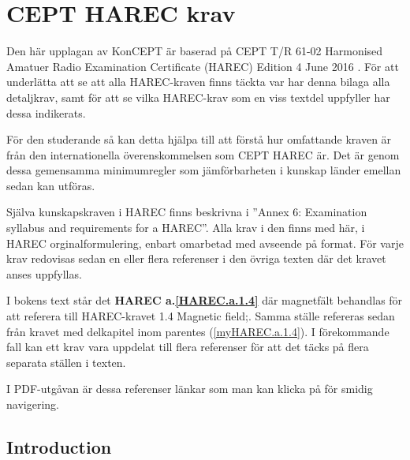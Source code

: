 
\chapter{CEPT HAREC krav}
\label{CEPT HAREC}

Den här upplagan av KonCEPT är baserad på CEPT T/R 61-02 Harmonised Amatuer
Radio Examination Certificate (HAREC) Edition 4 June 2016 \cite{TR6102}.
För att underlätta att se att alla HAREC-kraven finns täckta var har denna
bilaga alla detaljkrav, samt för att se vilka HAREC-krav som en viss textdel
uppfyller har dessa indikerats.

För den studerande så kan detta hjälpa till att förstå hur omfattande kraven är
från den internationella överenskommelsen som CEPT HAREC är.
Det är genom dessa gemensamma minimumregler som jämförbarheten i kunskap
länder emellan sedan kan utföras.

Själva kunskapskraven i HAREC finns beskrivna i
''Annex 6: Examination syllabus and requirements for a HAREC''.
Alla krav i den finns med här, i HAREC orginalformulering, enbart omarbetad
med avseende på format.
För varje krav redovisas sedan en eller flera referenser i den övriga texten
där det kravet anses uppfyllas.

I bokens text står det \textbf{HAREC a.\ref{HAREC.a.1.4}} där magnetfält
behandlas för att referera till HAREC-kravet 1.4 Magnetic field;.
Samma ställe refereras sedan från kravet med delkapitel inom parentes
(\ref{myHAREC.a.1.4}).
I förekommande fall kan ett krav vara uppdelat till flera referenser för att
det täcks på flera separata ställen i texten.

I PDF-utgåvan är dessa referenser länkar som man kan klicka på för smidig
navigering.

\section{Introduction}

\makeatletter
\renewcommand{\theenumii}{\arabic{enumii}}
\renewcommand{\labelenumii}{\theenumi.\theenumii}
\renewcommand{\p@enumii}{\theenumi.}

\renewcommand{\theenumiii}{\arabic{enumiii}}
\renewcommand{\labelenumiii}{\theenumi.\theenumii.\theenumiii}
\renewcommand{\p@enumiii}{\theenumi.\theenumii.}
\makeatother

